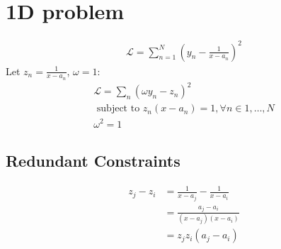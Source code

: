 \documentclass{article}
\begin{document}
\section{1D problem}


\begin{align}
    \mathcal{L} = \sum_{n = 1}^N \left( y_n - \frac{1}{x - a_n}\right)^2
\end{align}
Let $z_n = \frac{1}{x - a_n}$, $\omega = 1$:
\begin{align}
    \mathcal{L} = \sum_n \left( \omega y_n - z_n \right)^2 \\
    \text{ subject to }  z_n(x - a_n) = 1, \forall n \in {1, \dots, N} \\
    \omega^2 = 1
\end{align}

\subsection{Redundant Constraints}

\begin{align}
    z_j - z_i  &= \frac{1}{x - a_j} - \frac{1}{x - a_i}\\
    &= \frac{a_j - a_i}{(x - a_j)(x - a_i)} \\
    &= z_j z_i (a_j - a_i)
\end{align}
\end{document}
